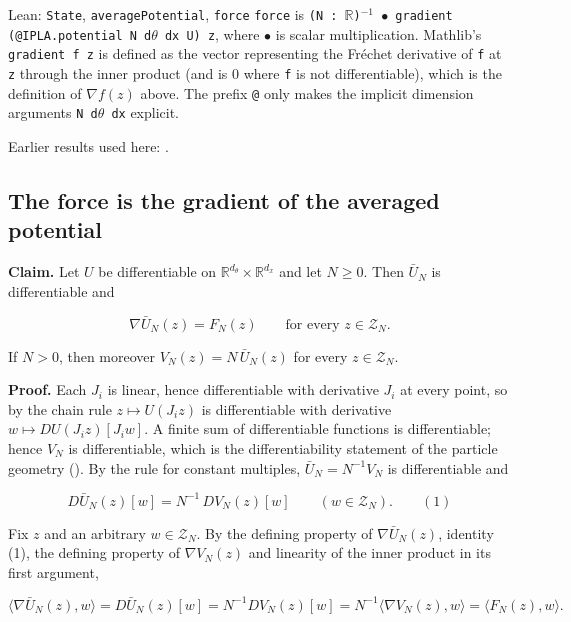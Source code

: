 \documentclass[11pt,a4paper]{report}
\begin{document}
\begin{leanbox}{Lean: \texttt{State}, \texttt{averagePotential}, \texttt{force}}
\texttt{force} is \texttt{(N : \ensuremath{\mathbb R})\ensuremath{{}^{-1}} \ensuremath{\bullet} gradient (@IPLA.\allowbreak{}potential N d\ensuremath{\theta} dx U) z}, where \texttt{\ensuremath{\bullet}} is scalar multiplication. Mathlib's \texttt{gradient f z} is defined as the vector representing the Fréchet derivative of \texttt{f} at \texttt{z} through the inner product (and is \(0\) where \texttt{f} is not differentiable), which is the definition of \(\nabla f(z)\) above. The prefix \texttt{@} only makes the implicit dimension arguments \texttt{N d\ensuremath{\theta} dx} explicit.
\end{leanbox}


Earlier results used here: \cite[Section~3.1.1]{LangevinLean2026IPLA}.
\subsection{\texorpdfstring{The force is the gradient of the averaged potential}{The force is the gradient of the averaged potential}}
\label{report-step-KIPLMC-Geometry-lean-2}


\textbf{Claim.} Let \(U\) be differentiable on \(\mathbb R^{d_\theta}\times\mathbb R^{d_x}\) and let \(N\ge0\). Then \(\bar U_N\) is differentiable and


\[\nabla\bar U_N(z)=F_N(z)\qquad\text{for every }z\in\mathcal Z_N.\]


If \(N>0\), then moreover \(V_N(z)=N\,\bar U_N(z)\) for every \(z\in\mathcal Z_N\).




\textbf{Proof.} Each \(J_i\) is linear, hence differentiable with derivative \(J_i\) at every point, so by the chain rule \(z\mapsto U(J_iz)\) is differentiable with derivative \(w\mapsto DU(J_iz)[J_iw]\). A finite sum of differentiable functions is differentiable; hence \(V_N\) is differentiable, which is the differentiability statement of the particle geometry (\cite[Section~3.1.3]{LangevinLean2026IPLA}). By the rule for constant multiples, \(\bar U_N=N^{-1}V_N\) is differentiable and


\[D\bar U_N(z)[w]=N^{-1}\,DV_N(z)[w]\qquad(w\in\mathcal Z_N).\qquad(1)\]


Fix \(z\) and an arbitrary \(w\in\mathcal Z_N\). By the defining property of \(\nabla\bar U_N(z)\), identity (1), the defining property of \(\nabla V_N(z)\) and linearity of the inner product in its first argument,


\[\langle\nabla\bar U_N(z),w\rangle=D\bar U_N(z)[w]=N^{-1}DV_N(z)[w]=N^{-1}\langle\nabla V_N(z),w\rangle=\langle F_N(z),w\rangle.\]
\end{document}
